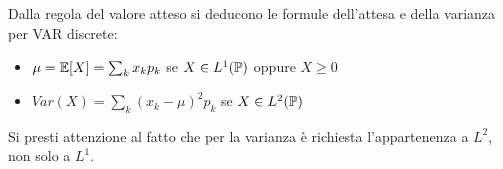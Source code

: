 \medskip
\begin{oss}
  Dalla regola del valore atteso si deducono le formule dell'attesa e della varianza per VAR discrete:
  \begin{itemize}
    \item $\mu = \mathbb E[X]=\sum_{k}x_kp_k$ se $X \in L^1(\mathbb P)$ oppure $X \geq 0$
    \item $Var(X)=\sum_{k}(x_k-\mu)^2p_k$ se $X \in L^2(\mathbb P)$
  \end{itemize}
  Si presti attenzione al fatto che per la varianza è richiesta l'appartenenza a $L^2$, non solo a $L^1$.
\end{oss}

\cleardoublepage
